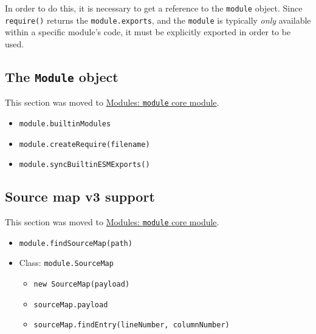 In order to do this, it is necessary to get a reference to the
\texttt{module} object. Since \texttt{require()} returns the
\texttt{module.exports}, and the \texttt{module} is typically
\emph{only} available within a specific module's code, it must be
explicitly exported in order to be used.

\subsection{\texorpdfstring{The \texttt{Module}
object}{The Module object}}\label{the-module-object-1}

This section was moved to \href{module.md\#the-module-object}{Modules:
\texttt{module} core module}.

\begin{itemize}
\tightlist
\item
  \texttt{module.builtinModules}
\item
  \texttt{module.createRequire(filename)}
\item
  \texttt{module.syncBuiltinESMExports()}
\end{itemize}

\subsection{Source map v3 support}\label{source-map-v3-support}

This section was moved to
\href{module.md\#source-map-v3-support}{Modules: \texttt{module} core
module}.

\begin{itemize}
\tightlist
\item
  \texttt{module.findSourceMap(path)}
\item
  Class: \texttt{module.SourceMap}

  \begin{itemize}
  \tightlist
  \item
    \texttt{new\ SourceMap(payload)}
  \item
    \texttt{sourceMap.payload}
  \item
    \texttt{sourceMap.findEntry(lineNumber,\ columnNumber)}
  \end{itemize}
\end{itemize}
